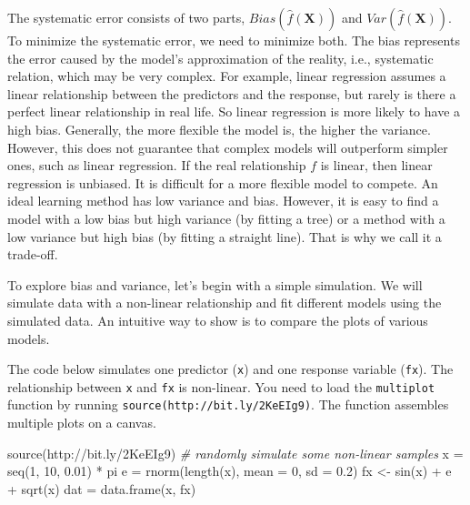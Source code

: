 \documentclass[
  12pt,
]{krantz}
\makeatletter
\newenvironment{Shaded}{\begin{snugshade}}{\end{snugshade}}
\newcommand{\AttributeTok}[1]{\textcolor[rgb]{0.61,0.61,0.61}{#1}}
\newcommand{\CommentTok}[1]{\textcolor[rgb]{0.37,0.37,0.37}{\textit{#1}}}
\newcommand{\DecValTok}[1]{\textcolor[rgb]{0.06,0.06,0.06}{#1}}
\newcommand{\FloatTok}[1]{\textcolor[rgb]{0.06,0.06,0.06}{#1}}
\newcommand{\FunctionTok}[1]{\textcolor[rgb]{0,0,0}{#1}}
\newcommand{\NormalTok}[1]{#1}
\newcommand{\OtherTok}[1]{\textcolor[rgb]{0.37,0.37,0.37}{#1}}
\newcommand{\SpecialCharTok}[1]{\textcolor[rgb]{0,0,0}{#1}}
\newcommand{\StringTok}[1]{\textcolor[rgb]{0.5,0.5,0.5}{#1}}
\newenvironment{kframe}{%
\medskip{}
\setlength{\fboxsep}{.8em}
 \def\at@end@of@kframe{}%
 \ifinner\ifhmode%
  \def\at@end@of@kframe{\end{minipage}}%
  \begin{minipage}{\columnwidth}%
 \fi\fi%
 \def\FrameCommand##1{\hskip\@totalleftmargin \hskip-\fboxsep
 \colorbox{shadecolor}{##1}\hskip-\fboxsep
     \hskip-\linewidth \hskip-\@totalleftmargin \hskip\columnwidth}%
 \MakeFramed {\advance\hsize-\width
   \@totalleftmargin\z@ \linewidth\hsize
   \@setminipage}}%
 {\par\unskip\endMakeFramed%
 \at@end@of@kframe}
\renewenvironment{Shaded}{\begin{kframe}}{\end{kframe}}
\makeatother
\begin{document}
The systematic error consists of two parts, \(Bias(\hat{f}(\mathbf{X}))\) and \(Var (\hat{f}(\mathbf{X}))\). To minimize the systematic error, we need to minimize both. The bias represents the error caused by the model's approximation of the reality, i.e., systematic relation, which may be very complex. For example, linear regression assumes a linear relationship between the predictors and the response, but rarely is there a perfect linear relationship in real life. So linear regression is more likely to have a high bias. Generally, the more flexible the model is, the higher the variance. However, this does not guarantee that complex models will outperform simpler ones, such as linear regression. If the real relationship \(f\) is linear, then linear regression is unbiased. It is diﬀicult for a more flexible model to compete. An ideal learning method has low variance and bias. However, it is easy to find a model with a low bias but high variance (by fitting a tree) or a method with a low variance but high bias (by fitting a straight line). That is why we call it a trade-off.

To explore bias and variance, let's begin with a simple simulation. We will simulate data with a non-linear relationship and fit different models using the simulated data. An intuitive way to show is to compare the plots of various models.

The code below simulates one predictor (\texttt{x}) and one response variable (\texttt{fx}). The relationship between \texttt{x} and \texttt{fx} is non-linear. You need to load the \texttt{multiplot} function by running \texttt{source(\textquotesingle{}http://bit.ly/2KeEIg9\textquotesingle{})}. The function assembles multiple plots on a canvas.

\begin{Shaded}
\begin{Highlighting}[]
\FunctionTok{source}\NormalTok{(}\StringTok{\textquotesingle{}http://bit.ly/2KeEIg9\textquotesingle{}}\NormalTok{)}
\CommentTok{\# randomly simulate some non{-}linear samples}
\NormalTok{x }\OtherTok{=} \FunctionTok{seq}\NormalTok{(}\DecValTok{1}\NormalTok{, }\DecValTok{10}\NormalTok{, }\FloatTok{0.01}\NormalTok{) }\SpecialCharTok{*}\NormalTok{ pi}
\NormalTok{e }\OtherTok{=} \FunctionTok{rnorm}\NormalTok{(}\FunctionTok{length}\NormalTok{(x), }\AttributeTok{mean =} \DecValTok{0}\NormalTok{, }\AttributeTok{sd =} \FloatTok{0.2}\NormalTok{)}
\NormalTok{fx }\OtherTok{\textless{}{-}} \FunctionTok{sin}\NormalTok{(x) }\SpecialCharTok{+}\NormalTok{ e }\SpecialCharTok{+} \FunctionTok{sqrt}\NormalTok{(x)}
\NormalTok{dat }\OtherTok{=} \FunctionTok{data.frame}\NormalTok{(x, fx)}
\end{Highlighting}
\end{Shaded}
\end{document}

